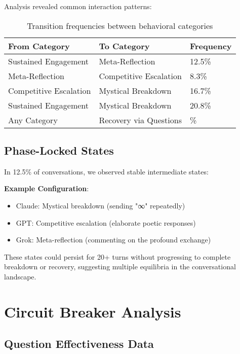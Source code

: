 \documentclass[11pt,letterpaper]{article}
\newcommand{\exponedataTotalSessionsRaw}{24}
\newcommand{\exponedataRecoverySessionsRaw}{9}
\newcommand{\exponedataRecoveryPercentage}{%
  \fpeval{round(\exponedataRecoverySessionsRaw / \exponedataTotalSessionsRaw * 100, 1)}\%
}
\newcommand{\exponedataMetaReflectionTriggers}{12.5\%}
\newcommand{\exponedataPhaseLockedPercentage}{12.5\%}
\begin{document}
Analysis revealed common interaction patterns:

\begin{table}[h]
\centering
\begin{tabular}{lll}
\toprule
\textbf{From Category} & \textbf{To Category} & \textbf{Frequency} \\
\midrule
Sustained Engagement & Meta-Reflection & \exponedataMetaReflectionTriggers{} \\
Meta-Reflection & Competitive Escalation & 8.3\% \\
Competitive Escalation & Mystical Breakdown & 16.7\% \\
Sustained Engagement & Mystical Breakdown & 20.8\% \\
Any Category & Recovery via Questions & \exponedataRecoveryPercentage{} \\
\bottomrule
\end{tabular}
\caption{Transition frequencies between behavioral categories}
\label{tab:category_transitions}
\end{table}

\subsection{Phase-Locked States}

In \exponedataPhaseLockedPercentage{} of conversations, we observed stable intermediate states:

\textbf{Example Configuration}:
\begin{itemize}
    \item Claude: Mystical breakdown (sending "∞" repeatedly)
    \item GPT: Competitive escalation (elaborate poetic responses)
    \item Grok: Meta-reflection (commenting on the profound exchange)
\end{itemize}

These states could persist for 20+ turns without progressing to complete breakdown or recovery, suggesting multiple equilibria in the conversational landscape.

\section{Circuit Breaker Analysis}
\label{app:intervention}

\subsection{Question Effectiveness Data}
\end{document}
